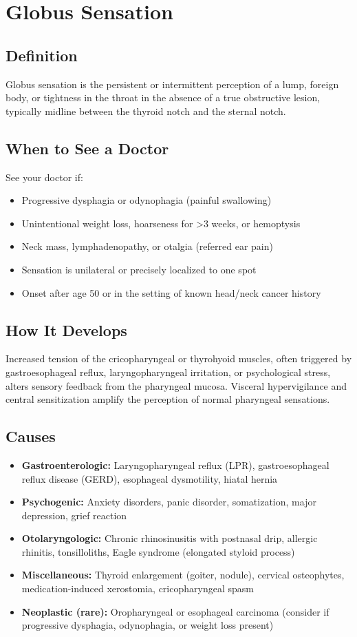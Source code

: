 \chapter{Globus Sensation}

\section*{Definition}
Globus sensation is the persistent or intermittent perception of a lump, foreign body, or tightness in the throat in the absence of a true obstructive lesion, typically midline between the thyroid notch and the sternal notch.

\section*{When to See a Doctor}
See your doctor if:
\begin{itemize}
  \item Progressive dysphagia or odynophagia (painful swallowing)
  \item Unintentional weight loss, hoarseness for \textgreater{}3 weeks, or hemoptysis
  \item Neck mass, lymphadenopathy, or otalgia (referred ear pain)
  \item Sensation is unilateral or precisely localized to one spot
  \item Onset after age 50 or in the setting of known head/neck cancer history
\end{itemize}

\section*{How It Develops}
Increased tension of the cricopharyngeal or thyrohyoid muscles, often triggered by gastroesophageal reflux, laryngopharyngeal irritation, or psychological stress, alters sensory feedback from the pharyngeal mucosa. Visceral hypervigilance and central sensitization amplify the perception of normal pharyngeal sensations.

\section*{Causes}
\begin{itemize}
  \item \textbf{Gastroenterologic:} Laryngopharyngeal reflux (LPR), gastroesophageal reflux disease (GERD), esophageal dysmotility, hiatal hernia
  \item \textbf{Psychogenic:} Anxiety disorders, panic disorder, somatization, major depression, grief reaction
  \item \textbf{Otolaryngologic:} Chronic rhinosinusitis with postnasal drip, allergic rhinitis, tonsilloliths, Eagle syndrome (elongated styloid process)
  \item \textbf{Miscellaneous:} Thyroid enlargement (goiter, nodule), cervical osteophytes, medication-induced xerostomia, cricopharyngeal spasm
  \item \textbf{Neoplastic (rare):} Oropharyngeal or esophageal carcinoma (consider if progressive dysphagia, odynophagia, or weight loss present)
\end{itemize}

